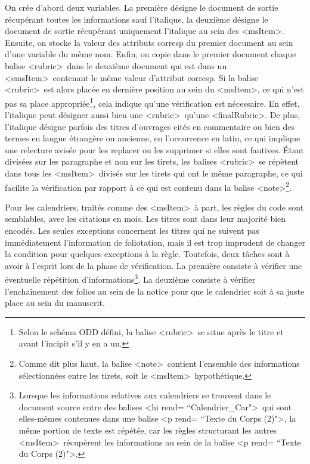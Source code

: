 \documentclass[a4paper,12pt,twoside]{book}
\begin{document}
On crée d'abord deux variables. La première désigne le document de sortie récupérant toutes les informations sauf l'italique, la deuxième désigne le document de sortie récupérant uniquement l'italique au sein des \textless msItem\textgreater . Ensuite, on stocke la valeur des attributs corresp du premier document au sein d'une variable du même nom. Enfin, on copie dans le premier document chaque balise \textless rubric\textgreater~dans le deuxième document qui est dans un \textless emsItem\textgreater~contenant le même valeur d'attribut corresp. Si la balise \textless rubric\textgreater~est alors placée en dernière position au sein du \textless msItem\textgreater, ce qui n'est pas sa place appropriée\footnote{Selon le schéma ODD défini, la balise \textless rubric\textgreater~se situe après le titre et avant l'incipit s'il y en a un.}, cela indique qu'une vérification est nécessaire. En effet, l'italique peut désigner aussi bien une \textless rubric\textgreater~qu'une \textless finalRubric\textgreater. De plus, l'italique désigne parfois des titres d'ouvrages cités en commentaire ou bien des termes en langue étrangère ou ancienne, en l'occurrence en latin, ce qui implique une relecture avisée pour les replacer ou les supprimer si elles sont fautives. Étant divisées sur les paragraphe et non sur les tirets, les balises \textless rubric\textgreater~se répètent dans tous les \textless msItem\textgreater~divisés sur les tirets qui ont le même paragraphe, ce qui facilite la vérification par rapport à ce qui est contenu dans la balise \textless note\textgreater\footnote{Comme dit plus haut, la balise \textless note\textgreater~contient l'ensemble des informations sélectionnées entre les tirets, soit le \textless msItem\textgreater~hypothétique.}. 

Pour les calendriers, traités comme des \textless msItem\textgreater~à part, les règles du code sont semblables, avec les citations en mois. Les titres sont dans leur majorité bien encodés. Les seules exceptions concernent les titres qui ne suivent pas immédiatement l'information de foliotation, mais il est trop imprudent de changer la condition pour quelques exceptions à la règle. Toutefois, deux tâches sont à avoir à l'esprit lors de la phase de vérification. La première consiste à vérifier une éventuelle répétition d'informations\footnote{Lorsque les informations relatives aux calendriers se trouvent dans le document source entre des balises \textless hi rend= ``Calendrier\_Car"\textgreater~qui sont elles-mêmes contenues dans une balise \textless p rend= ``Texte du Corps (2)"\textgreater, la même portion de texte est répétée, car les règles structurant les autres \textless msItem\textgreater~récupèrent les informations au sein de la balise \textless p rend= ``Texte du Corps (2)"\textgreater .}. La deuxième consiste à vérifier l'enchaînement des folios au sein de la notice pour que le calendrier soit à sa juste place au sein du manuscrit.
\end{document}
